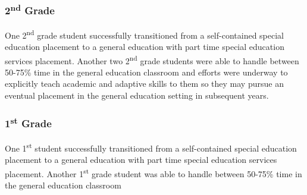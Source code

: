 \documentclass[twoside]{article}
\begin{document}
\subsubsection{2\textsuperscript{nd} Grade}
One 2\textsuperscript{nd} grade student successfully transitioned from a self-contained special education placement to a general education with part time special education services placement. Another two 2\textsuperscript{nd} grade students were able to handle between 50-75\% time in the general education classroom and efforts were underway to explicitly teach academic and adaptive skills to them so they may pursue an eventual placement in the general education setting in subsequent years.

\subsubsection{1\textsuperscript{st} Grade}
One 1\textsuperscript{st} student successfully transitioned from a self-contained special education placement to a general education with part time special education services placement. Another 1\textsuperscript{st} grade student was able to handle between 50-75\% time in the general education classroom
%
%
\end{document}
